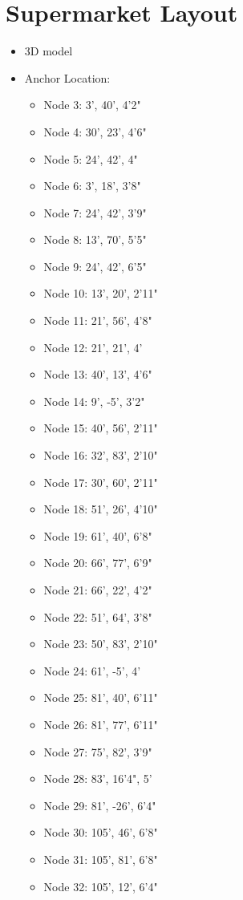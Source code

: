 \documentclass{article}
\begin{document}
\section{Supermarket Layout}
\begin{itemize}
\item 3D model
\item Anchor Location:
	\begin{itemize}
	\item Node 3: 3', 40', 4'2"
	\item Node 4: 30', 23', 4'6"
	\item Node 5: 24', 42', 4"
	\item Node 6: 3', 18', 3'8"
	\item Node 7: 24', 42', 3'9"
	\item Node 8: 13', 70', 5'5"
	\item Node 9: 24', 42', 6'5"
	\item Node 10: 13', 20', 2'11"
	\item Node 11: 21', 56', 4'8"
	\item Node 12: 21', 21', 4'
	\item Node 13: 40', 13', 4'6"
	\item Node 14: 9', -5', 3'2" 
	\item Node 15: 40', 56', 2'11"
 	\item Node 16: 32', 83', 2'10"
	\item Node 17: 30', 60', 2'11"
	\item Node 18: 51', 26', 4'10"
	\item Node 19: 61', 40', 6'8"
	\item Node 20: 66', 77', 6'9"
	\item Node 21: 66', 22', 4'2"
	\item Node 22: 51', 64', 3'8"
	\item Node 23: 50', 83', 2'10"
	\item Node 24: 61', -5', 4'
	\item Node 25: 81', 40', 6'11"
	\item Node 26: 81', 77', 6'11"
	\item Node 27: 75', 82', 3'9"
	\item Node 28: 83', 16'4", 5'
	\item Node 29: 81', -26', 6'4"
	\item Node 30: 105', 46', 6'8"
	\item Node 31: 105', 81', 6'8"
	\item Node 32: 105', 12', 6'4"	
	\end{itemize}
\end{itemize}
\end{document}
